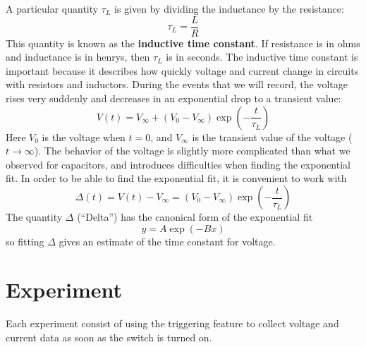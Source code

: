 A particular quantity $\tau_{L}$ is given by dividing the inductance by the resistance:
\begin{equation}
	\tau_{L} = \frac{L}{R}
	\label{eq.05L.tauL}
\end{equation}
This quantity is known as the \textbf{inductive time constant}. If resistance is in ohms and inductance is in henrys, then $\tau_{L}$ is in seconds. The inductive time constant is important because it describes how quickly voltage and current change in circuits with resistors and inductors. During the events that we will record, the voltage rises very suddenly and decreases in an exponential drop to a transient value:
\begin{equation}
	V(t) = V_{\infty} + (V_{0} - V_{\infty}) \exp{\left( - \frac{t}{\tau_{L}} \right)}
	\label{eq.05L.Vt}
\end{equation}
Here $V_{0}$ is the voltage when $t = 0$, and $V_{\infty}$ is the transient value of the voltage ($t \longrightarrow \infty$). The behavior of the voltage is slightly more complicated than what we observed for capacitors, and introduces difficulties when finding the exponential fit. In order to be able to find the exponential fit, it is convenient to work with
\begin{equation}
	\Delta(t) = V(t) - V_{\infty} = (V_{0} - V_{\infty}) \exp{\left( - \frac{t}{\tau_{L}} \right)}
	\label{eq.05L.Delta.t}
\end{equation}
The quantity $\Delta$ (``Delta'') has the canonical form of the exponential fit
\begin{equation}
	y = A \exp{(-Bx)}
\end{equation}
so fitting $\Delta$ gives an estimate of the time constant for voltage.
\section{Experiment}
Each experiment consist of using the triggering feature to collect voltage and current data as soon as the switch is turned on.

